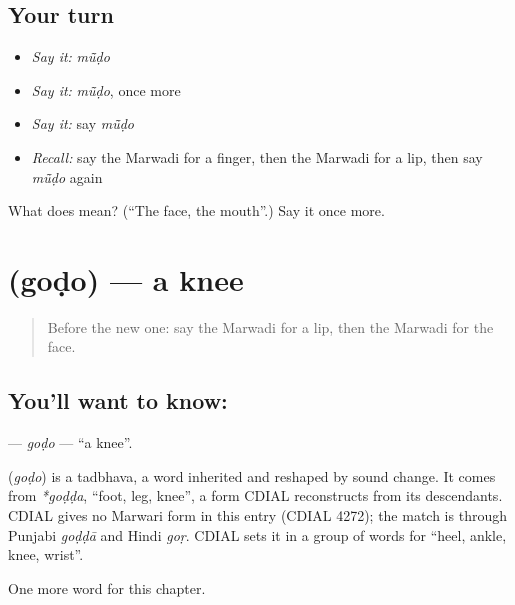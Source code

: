 \subsection*{Your turn}
\begin{itemize}
\raggedright
  \item \emph{Say it:} \emph{mū̃ḍo}
  \item \emph{Say it:} \emph{mū̃ḍo}, once more
  \item \emph{Say it:} say \emph{mū̃ḍo}
  \item \emph{Recall:} say the Marwadi for a finger, then the Marwadi for a lip, then say \emph{mū̃ḍo} again
\end{itemize}

\begin{tcolorbox}[breakable,colback=teal!4,colframe=teal!35!black,title={Before you move on}]
What does  mean? (\textquotedblleft{}The face, the mouth\textquotedblright{}.) Say it once more.
\end{tcolorbox}
\section[\texorpdfstring{\mw{गोडो} (goḍo)}{गोडो (goḍo)}]{ (goḍo) — a knee}

\label{lesson:MW-C45-godo}



\begin{quote}
Before the new one: say the Marwadi for a lip, then the Marwadi for the face.
\end{quote}

\subsection*{You'll want to know: }
\textbf{} — \emph{goḍo} — \textquotedblleft{}a knee\textquotedblright{}.

\begin{cousinweb}
\textbf{} (\emph{goḍo}) is a tadbhava, a word inherited and reshaped by sound change. It comes from \emph{*goḍḍa}, \textquotedblleft{}foot, leg, knee\textquotedblright{}, a form CDIAL reconstructs from its descendants. CDIAL gives no Marwari form in this entry (CDIAL 4272); the match is through Punjabi \emph{goḍḍā} and Hindi \emph{goṛ}. CDIAL sets it in a group of words for \textquotedblleft{}heel, ankle, knee, wrist\textquotedblright{}.
\end{cousinweb}

\begin{grammarlens}[title={What you've built}]
One more word for this chapter.
\end{grammarlens}

